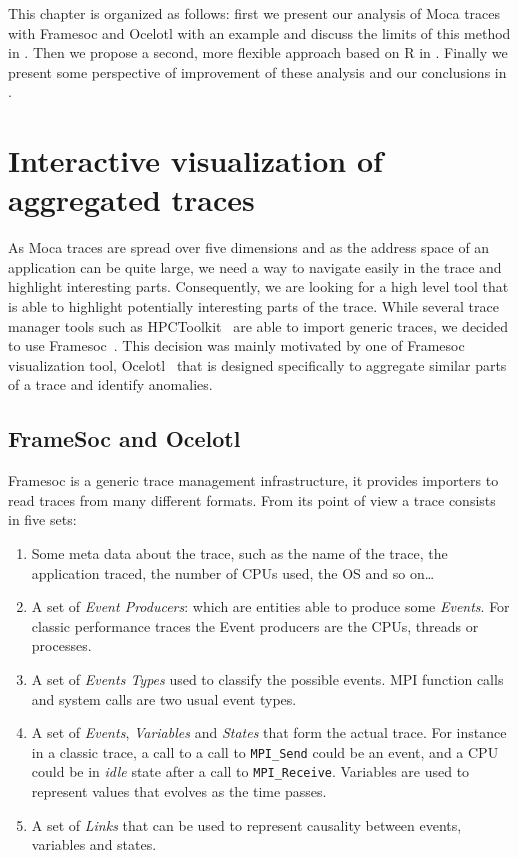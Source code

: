 This chapter is organized as follows: first we present our analysis of \gls{Moca} traces with \gls{Framesoc} and \gls{Ocelotl} with an example and discuss the limits of this method in .
Then we propose a second, more flexible approach based on \gls{R} in .
Finally we present some perspective of improvement of these analysis and our conclusions in .


\section{Interactive visualization of aggregated traces}
\label{sec:visu-first}

As \gls{Moca} traces are spread over five dimensions and as the address space of an application can be quite large, we need a way to navigate easily in the trace and highlight interesting parts.
Consequently, we are looking for a high level tool that is able to highlight potentially interesting parts of the trace.
While several trace manager tools such as \gls{HPCToolkit}~\cite{Adhianto10HPCTOOLKIT} are able to import generic traces, we decided to use \gls{Framesoc}~\cite{Pagano14frameSoC}.
This decision was mainly motivated by one of \gls{Framesoc} visualization tool, \gls{Ocelotl}~\cite{Dosimont14Ocelotl} that is designed specifically to aggregate similar parts of a trace and identify anomalies.

\subsection{FrameSoc and Ocelotl}

\gls{Framesoc} is a generic trace management infrastructure, it provides importers to read traces from many different formats.
From its point of view a trace consists in five sets:
\begin{enumerate}
    \item Some meta data about the trace, such as the name of the trace, the application traced, the number of \glspl{CPU} used, the \gls{OS} and so on\ldots
    \item A set of \emph{Event Producers}: which are entities able to produce some \emph{Events}.
        For classic performance traces the Event producers are the \glspl{CPU}, threads or processes.
    \item A set of \emph{Events Types} used to classify the possible events.
        \gls{MPI} function calls and system calls are two usual event types.
    \item A set of \emph{Events}, \emph{Variables} and \emph{States} that form the actual trace.
        For instance in a classic trace, a call to a call to \texttt{MPI\_Send} could be an event, and a \gls{CPU} could be in \emph{idle} state after a call to \texttt{MPI\_Receive}.
        Variables are used to represent values that evolves as the time passes.
    \item A set of \emph{Links} that can be used to represent causality between events, variables and states.
\end{enumerate}

